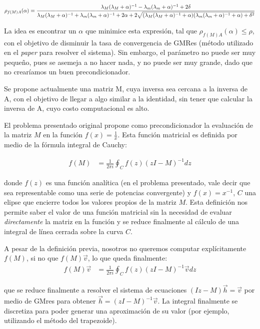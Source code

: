 \documentclass[fleqn]{article}
\begin{document}
\begin{equation}
 \rho_{f(M)A}(\alpha) = \frac{\lambda_{M}(\lambda_{M}+\alpha)^{-1} - \lambda_{m}(\lambda_{m}+\alpha)^{-1} + 2\delta}{\lambda_{M}(\lambda_{M}+\alpha)^{-1} + \lambda_{m}(\lambda_{m}+\alpha)^{-1} + 2\alpha + 2\sqrt{(\lambda_{M}(\lambda_{M}+\alpha)^{-1}+\alpha)(\lambda_{m}(\lambda_{m}+\alpha)^{-1}+\alpha) + \delta^{2}}}\\
\end{equation}

La idea es encontrar un $\alpha$ que minimice esta expresión, tal que $\rho_{f(M)A}(\alpha) \le \rho$, con el objetivo de disminuir la tasa de convergencia de GMRes (método utilizado en el \textit{paper} para resolver el sistema). Sin embargo, el parámetro no puede ser muy pequeño, pues se asemeja a no hacer nada, y no puede ser muy grande, dado que no crearíamos un buen precondicionador.

Se propone actualmente una matriz M, cuya inversa sea cercana a la inversa de A, con el objetivo de llegar a algo similar a la identidad, sin tener que calcular la inversa de A, cuyo costo computacional es alto.

El problema presentado original propone como precondicionador la evaluación de la matriz $M$ en la función $f(x) = \frac{1}{x}$. Esta función matricial es definida por medio de la fórmula integral de Cauchy:

\begin{align*}
f(M) &= \frac{1}{2\pi i} \oint_C f(z)(zI - M)^{-1}dz
\end{align*}

donde $f(z)$ es una función analítica (en el problema presentado, vale decir que sea representable como una serie de potencias convergente) y $f(x) = x^{-1}$, $C$ una elipse que encierre todos los valores propios de la matriz $M$. Esta definición nos permite saber el valor de una función matricial sin la necesidad de evaluar \textit{directamente} la matriz en la función y se reduce finalmente al cálculo de una integral de línea cerrada sobre la curva $C$.

A pesar de la definición previa, nosotros no queremos computar explícitamente $f(M)$, si no que $f(M)\vec{v}$, lo que queda finalmente:
\begin{align*}
f(M)\vec{v} &= \frac{1}{2\pi i} \oint_C f(z)(zI - M)^{-1}\vec{v}dz
\end{align*}

que se reduce finalmente a resolver el sistema de ecuaciones $(Iz - M)\vec{h} = \vec{v}$ por medio de GMres para obtener $\vec{h} = (zI - M)^{-1}\vec{v}$. La integral finalmente se discretiza para poder generar una aproximación de su valor (por ejemplo, utilizando el método del trapezoide).
\end{document}
